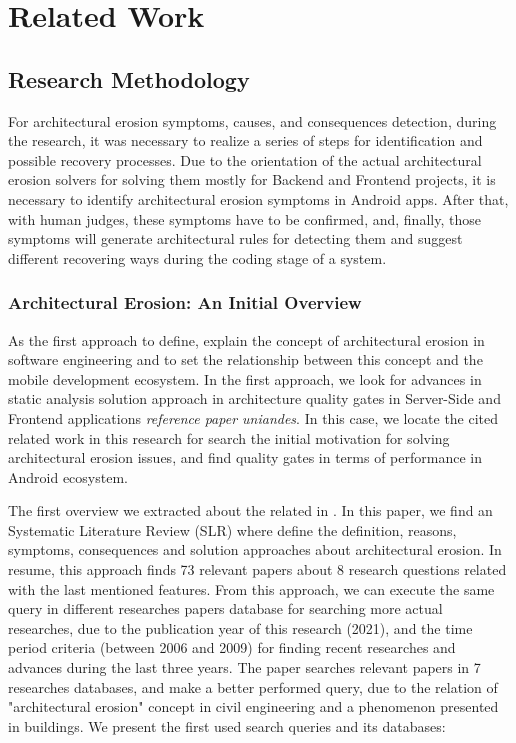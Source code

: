 \chapter{Related Work}
\label{cha:relatedwork}

\section{Research Methodology}
For architectural erosion symptoms, causes, and consequences detection, during the research, it was necessary to realize a series of steps for identification and possible recovery processes. Due to the orientation of the actual architectural erosion solvers for solving them mostly for Backend and Frontend projects, it is necessary to identify architectural erosion symptoms in Android apps. After that, with human judges, these symptoms have to be confirmed, and, finally, those symptoms will generate architectural rules for detecting them and suggest different recovering ways during the coding stage of a system.

\subsection{Architectural Erosion: An Initial Overview}
As the first approach to define, explain the concept of architectural erosion in software engineering and to set the relationship between this concept and the mobile development ecosystem. In the first approach, we look for advances in static analysis solution approach in architecture quality gates in Server-Side and Frontend applications \emph{reference paper uniandes}. In this case, we locate the cited related work in this research for search the initial motivation for solving architectural erosion issues, and find quality gates in terms of performance in Android ecosystem.

The first overview we extracted about the related in \citet{slr-base}. In this paper, we find an Systematic Literature Review (SLR) where define the definition, reasons, symptoms, consequences and solution approaches about architectural erosion. In resume, this approach finds 73 relevant papers about 8 research questions related with the last mentioned features. From this approach, we can execute the same query in different researches papers database for searching more actual researches, due to the publication year of this research (2021), and the time period criteria (between 2006 and 2009) for finding recent researches and advances during the last three years. The paper searches relevant papers in 7 researches databases, and make a better performed query, due to the relation of "architectural erosion" concept in civil engineering and a phenomenon presented in buildings. We present the first used search queries and its databases:


